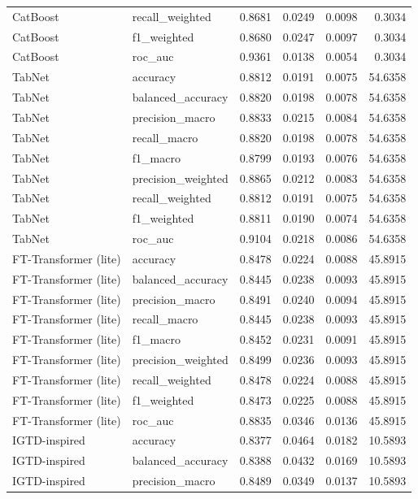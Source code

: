 \begin{tabular}{llrrrr}
CatBoost & recall_weighted & 0.8681 & 0.0249 & 0.0098 & 0.3034 \\
CatBoost & f1_weighted & 0.8680 & 0.0247 & 0.0097 & 0.3034 \\
CatBoost & roc_auc & 0.9361 & 0.0138 & 0.0054 & 0.3034 \\
TabNet & accuracy & 0.8812 & 0.0191 & 0.0075 & 54.6358 \\
TabNet & balanced_accuracy & 0.8820 & 0.0198 & 0.0078 & 54.6358 \\
TabNet & precision_macro & 0.8833 & 0.0215 & 0.0084 & 54.6358 \\
TabNet & recall_macro & 0.8820 & 0.0198 & 0.0078 & 54.6358 \\
TabNet & f1_macro & 0.8799 & 0.0193 & 0.0076 & 54.6358 \\
TabNet & precision_weighted & 0.8865 & 0.0212 & 0.0083 & 54.6358 \\
TabNet & recall_weighted & 0.8812 & 0.0191 & 0.0075 & 54.6358 \\
TabNet & f1_weighted & 0.8811 & 0.0190 & 0.0074 & 54.6358 \\
TabNet & roc_auc & 0.9104 & 0.0218 & 0.0086 & 54.6358 \\
FT-Transformer (lite) & accuracy & 0.8478 & 0.0224 & 0.0088 & 45.8915 \\
FT-Transformer (lite) & balanced_accuracy & 0.8445 & 0.0238 & 0.0093 & 45.8915 \\
FT-Transformer (lite) & precision_macro & 0.8491 & 0.0240 & 0.0094 & 45.8915 \\
FT-Transformer (lite) & recall_macro & 0.8445 & 0.0238 & 0.0093 & 45.8915 \\
FT-Transformer (lite) & f1_macro & 0.8452 & 0.0231 & 0.0091 & 45.8915 \\
FT-Transformer (lite) & precision_weighted & 0.8499 & 0.0236 & 0.0093 & 45.8915 \\
FT-Transformer (lite) & recall_weighted & 0.8478 & 0.0224 & 0.0088 & 45.8915 \\
FT-Transformer (lite) & f1_weighted & 0.8473 & 0.0225 & 0.0088 & 45.8915 \\
FT-Transformer (lite) & roc_auc & 0.8835 & 0.0346 & 0.0136 & 45.8915 \\
IGTD-inspired & accuracy & 0.8377 & 0.0464 & 0.0182 & 10.5893 \\
IGTD-inspired & balanced_accuracy & 0.8388 & 0.0432 & 0.0169 & 10.5893 \\
IGTD-inspired & precision_macro & 0.8489 & 0.0349 & 0.0137 & 10.5893 \\

\end{tabular}

